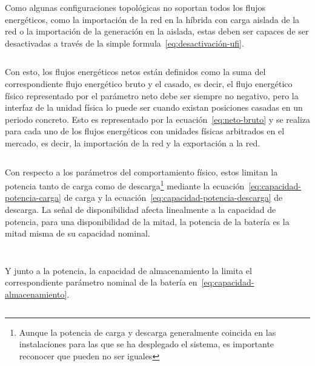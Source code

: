 Como algunas configuraciones topológicas no soportan todos los flujos energéticos, como la importación de la red en la híbrida con carga aislada de la red o la importación de la generación en la aislada, estas deben ser capaces de ser desactivadas a través de la simple formula~\ref{eq:desactivación-ufi}.

\begin{equation}
  \label{eq:desactivación-ufi}
\end{equation}

Con esto, los flujos energéticos netos están definidos como la suma del correspondiente flujo energético bruto y el casado, es decir, el flujo energético físico representado por el parámetro neto debe ser siempre no negativo, pero la interfaz de la unidad física lo puede ser cuando existan posiciones casadas en un periodo concreto. Esto es representado por la ecuación~\ref{eq:neto-bruto} y se realiza para cada uno de los flujos energéticos con unidades físicas arbitrados en el mercado, es decir, la importación de la red y la exportación a la red.

\begin{equation}
  \label{eq:neto-bruto}
\end{equation}

Con respecto a los parámetros del comportamiento físico, estos limitan la potencia tanto de carga como de descarga\footnote{Aunque la potencia de carga y descarga generalmente coincida en las instalaciones para las que se ha desplegado el sistema, es importante reconocer que pueden no ser iguales} mediante la ecuación~\ref{eq:capacidad-potencia-carga} de carga y la ecuación~\ref{eq:capacidad-potencia-descarga} de descarga. La señal de disponibilidad afecta linealmente a la capacidad de potencia, para una disponibilidad de la mitad, la potencia de la batería es la mitad misma de su capacidad nominal.

\begin{equation}
  \label{eq:capacidad-potencia-carga}
\end{equation}

\begin{equation}
  \label{eq:capacidad-potencia-descarga}
\end{equation}

Y junto a la potencia, la capacidad de almacenamiento la limita el correspondiente parámetro nominal de la batería en~\ref{eq:capacidad-almacenamiento}.

\begin{equation}
  \label{eq:capacidad-almacenamiento}
\end{equation}


